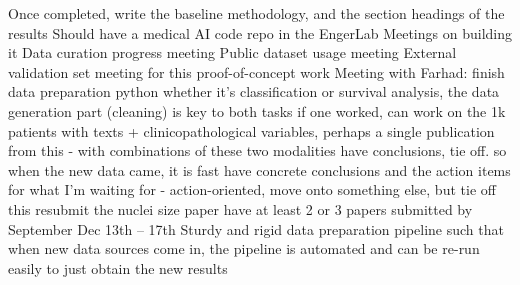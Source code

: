 \documentclass{article}%
\begin{document}
%
Once completed, write the baseline methodology, and the section headings of the results %
\newline%
\newline%
%
Should have a medical AI code repo in the EngerLab %
\newline%
\newline%
%
Meetings on building it %
\newline%
\newline%
%
Data curation progress meeting %
\newline%
\newline%
%
Public dataset usage meeting %
\newline%
\newline%
%
External validation set meeting for this proof{-}of{-}concept work %
\newline%
\newline%
%
Meeting with Farhad: %
\newline%
\newline%
%
finish data preparation python%
\newline%
\newline%
%
whether it's classification or survival analysis, the data generation part (cleaning) is key to both tasks%
\newline%
\newline%
%
if one worked, can work on the 1k patients with texts + clinicopathological variables, perhaps a single publication from this {-} with combinations of these two modalities %
\newline%
\newline%
%
have conclusions, tie off. so when the new data came, it is fast%
\newline%
\newline%
%
have concrete conclusions and the action items for what I'm waiting for {-} action{-}oriented, move onto something else, but tie off this %
\newline%
\newline%
%
resubmit the nuclei size paper%
\newline%
\newline%
%
have at least 2 or 3 papers submitted by September%
\newline%
\newline%
%
Dec 13th – 17th %
\newline%
\newline%
%
Sturdy and rigid data preparation pipeline such that when new data sources come in, the pipeline is automated and can be re{-}run easily to just obtain the new results %
\end{document}
